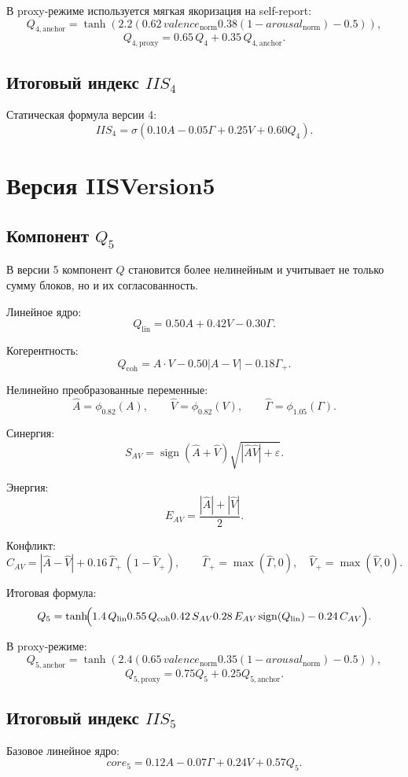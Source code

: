 \documentclass[12pt,a4paper]{article}
\begin{document}
В proxy-режиме используется мягкая якоризация на self-report:
\[
Q_{4,\mathrm{anchor}}=
\tanh\!\left(
2.2\left(
0.62\,valence_{\mathrm{norm}}
0.38(1-arousal_{\mathrm{norm}})
-0.5
\right)\right),
\]
\[
Q_{4,\mathrm{proxy}}=0.65\,Q_4+0.35\,Q_{4,\mathrm{anchor}}.
\]

\subsection{Итоговый индекс \(IIS_4\)}
Статическая формула версии 4:
\[
IIS_4=\sigma\!\left(0.10A-0.05\Gamma+0.25V+0.60Q_4\right).
\]

\section{Версия IISVersion5}
\subsection{Компонент \(Q_5\)}
В версии 5 компонент \(Q\) становится более нелинейным и учитывает не только сумму блоков, но и их согласованность.

Линейное ядро:
\[
Q_{\mathrm{lin}}=0.50A+0.42V-0.30\Gamma.
\]

Когерентность:
\[
Q_{\mathrm{coh}}=A\cdot V-0.50|A-V|-0.18\Gamma_+.
\]

Нелинейно преобразованные переменные:
\[
\widehat{A}=\phi_{0.82}(A),\qquad
\widehat{V}=\phi_{0.82}(V),\qquad
\widehat{\Gamma}=\phi_{1.05}(\Gamma).
\]

Синергия:
\[
S_{AV}=\operatorname{sign}(\widehat{A}+\widehat{V})\sqrt{|\widehat{A}\widehat{V}|+\varepsilon}.
\]

Энергия:
\[
E_{AV}=\frac{|\widehat{A}|+|\widehat{V}|}{2}.
\]

Конфликт:
\[
C_{AV}=|\widehat{A}-\widehat{V}|+0.16\,\widehat{\Gamma}_+\,(1-\widehat{V}_+),
\qquad
\widehat{\Gamma}_+=\max(\widehat{\Gamma},0),\quad
\widehat{V}_+=\max(\widehat{V},0).
\]

Итоговая формула:
\[
Q_5=
\tanh\!\Bigl(
1.4\,Q_{\mathrm{lin}}
0.55\,Q_{\mathrm{coh}}
0.42\,S_{AV}
0.28\,E_{AV}\operatorname{sign}(Q_{\mathrm{lin}})
-0.24\,C_{AV}
\Bigr).
\]

В proxy-режиме:
\[
Q_{5,\mathrm{anchor}}=
\tanh\!\left(
2.4\left(
0.65\,valence_{\mathrm{norm}}
0.35(1-arousal_{\mathrm{norm}})
-0.5
\right)\right),
\]
\[
Q_{5,\mathrm{proxy}}=0.75Q_5+0.25Q_{5,\mathrm{anchor}}.
\]

\subsection{Итоговый индекс \(IIS_5\)}
Базовое линейное ядро:
\[
core_5=0.12A-0.07\Gamma+0.24V+0.57Q_5.
\]
\end{document}
